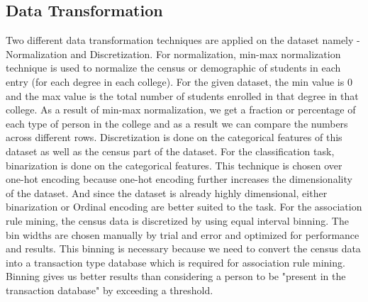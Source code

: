 \subsection{Data Transformation}
Two different data transformation techniques are applied on the dataset namely - Normalization and Discretization. 
For normalization, min-max normalization technique is used to normalize the census or demographic of students in each entry (for each degree in each college). For the given dataset, the min value is 0 and the max value is the total number of students enrolled in that degree in that college. As a result of min-max normalization, we get a fraction or percentage of each type of person in the college and as a result we can compare the numbers across different rows. 
Discretization is done on the categorical features of this dataset as well as the census part of the dataset. For the classification task, binarization is done on the categorical features. This technique is chosen over one-hot encoding because one-hot encoding further increases the dimensionality of the dataset. And since the dataset is already highly dimensional, either binarization or Ordinal encoding are better suited to the task. 
For the association rule mining, the census data is discretized by using equal interval binning. The bin widths are chosen manually by trial and error and optimized for performance and results. This binning is necessary because we need to convert the census data into a transaction type database which is required for association rule mining. Binning gives us better results than considering a person to be "present in the transaction database" by exceeding a threshold.

